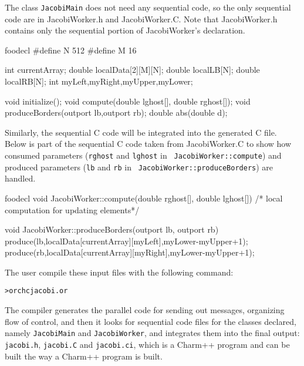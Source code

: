 \documentclass[10pt]{article}
\def\smallfbox#1{{\small \fbox{#1}}}
\begin{document}
The class {\tt JacobiMain} does not need any sequential code, so the only
sequential code are in JacobiWorker.h and JacobiWorker.C. Note that
JacobiWorker.h contains only the sequential portion of JacobiWorker's
declaration. 

\begin{SaveVerbatim}{foodecl}
#define N 512
#define M 16

int currentArray;	
double localData[2][M][N]; 
double localLB[N];
double localRB[N];
int myLeft,myRight,myUpper,myLower;

void initialize();
void compute(double lghost[], double rghost[]);
void produceBorders(outport lb,outport rb);
double abs(double d);
\end{SaveVerbatim}
\vspace{0.1in}
\smallfbox{\BUseVerbatim{foodecl}}
\vspace{0.1in}

Similarly, the sequential C code will be integrated into the generated C file.
Below is part of the sequential C code taken from JacobiWorker.C to show how
consumed parameters ({\tt rghost} and {\tt lghost} in {\tt
JacobiWorker::compute}) and produced parameters ({\tt lb} and {\tt rb} in {\tt
JacobiWorker::produceBorders}) are handled.

\begin{SaveVerbatim}{foodecl}
void JacobiWorker::compute(double rghost[], double lghost[]){
    /* local computation for updating elements*/
}

void JacobiWorker::produceBorders(outport lb, outport rb){
    produce(lb,localData[currentArray][myLeft],myLower-myUpper+1);
    produce(rb,localData[currentArray][myRight],myLower-myUpper+1);
}
\end{SaveVerbatim}
\vspace{0.1in}
\smallfbox{\BUseVerbatim{foodecl}}
\vspace{0.1in}

The user compile these input files with the following command:

\begin{alltt}
> orchc jacobi.or
\end{alltt}

The compiler generates the parallel code for sending out messages, organizing
flow of control, and then it looks for sequential code files for the classes
declared, namely {\tt JacobiMain} and {\tt JacobiWorker}, and integrates them
into the final output: {\tt jacobi.h}, {\tt jacobi.C} and {\tt jacobi.ci}, which
is a Charm++ program and can be built the way a Charm++ program is built.
\end{document}

